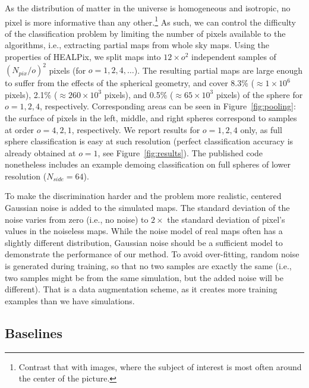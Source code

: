 \documentclass[final,twocolumn,3p,times,sort&compress]{elsarticle}
\newcommand{\figref}[1]{Figure~\ref{fig:#1}}
\newcommand{\1}{\b{1}}              %
\newcommand{\0}{\b{0}}              %
\begin{document}
As the distribution of matter in the universe is homogeneous and isotropic, no pixel is more informative than any other.\footnote{Contrast that with images, where the subject of interest is most often around the center of the picture.}
As such, we can control the difficulty of the classification problem by limiting the number of pixels available to the algorithms, i.e., extracting partial maps from whole sky maps.
Using the properties of HEALPix, we split maps into $12 \times o^2$ independent samples of $(N_{pix} / o)^2$ pixels (for $o=1,2,4,\dots$). The resulting partial maps are large enough to suffer from the effects of the spherical geometry, and cover 8.3\% ($\approx 1 \times 10^6$ pixels), 2.1\% ($\approx 260 \times 10^3$ pixels), and 0.5\% ($\approx 65 \times 10^3$ pixels) of the sphere for $o=1,2,4$, respectively.
Corresponding areas can be seen in \figref{pooling}: the surface of pixels in the left, middle, and right spheres correspond to samples at order $o=4,2,1$, respectively.
We report results for $o=1,2,4$ only, as full sphere classification is easy at such resolution (perfect classification accuracy is already obtained at $o=1$, see \figref{results}).
The published code nonetheless includes an example demoing classification on full spheres of lower resolution ($N_{side} = 64$).

To make the discrimination harder and the problem more realistic, centered Gaussian noise is added to the simulated maps.
The standard deviation of the noise varies from zero (i.e., no noise) to $2\times$ the standard deviation of pixel's values in the noiseless maps.
While the noise model of real maps often has a slightly different distribution, Gaussian noise should be a sufficient model to demonstrate the performance of our method.
To avoid over-fitting, random noise is generated during training, so that no two samples are exactly the same (i.e., two samples might be from the same simulation, but the added noise will be different).
That is a data augmentation scheme, as it creates more training examples than we have simulations.

\subsection{Baselines}
\end{document}
